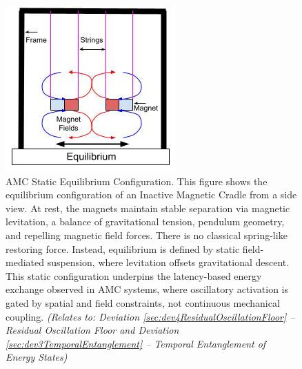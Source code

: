 \documentclass[10pt,aps,pre,onecolumn,superscriptaddress,notitlepage]{revtex4-2}
\begin{document}
\begin{figure}[h]
  \begin{minipage}[c]{0.36\linewidth}
    \includegraphics[width=\linewidth]{figures/AK1_AMC_RMI.jpg}
  \end{minipage}%
  \hfill
  \begin{minipage}[c]{0.5\linewidth}
    \caption{AMC Static Equilibrium Configuration. This figure shows the equilibrium configuration of an Inactive Magnetic Cradle from a side view. At rest, the magnets maintain stable separation via magnetic levitation, a balance of gravitational tension, pendulum geometry, and repelling magnetic field forces. There is no classical spring-like restoring force. Instead, equilibrium is defined by static field-mediated suspension, where levitation offsets gravitational descent. This static configuration underpins the latency-based energy exchange observed in AMC systems, where oscillatory activation is gated by spatial and field constraints, not continuous mechanical coupling. \textit{(Relates to: Deviation \ref{sec:dev4ResidualOscillationFloor} – Residual Oscillation Floor and Deviation \ref{sec:dev3TemporalEntanglement} – Temporal Entanglement of Energy States)}}
    \label{fig:amc_equilibrium}
  \end{minipage}
\end{figure}
\end{document}
